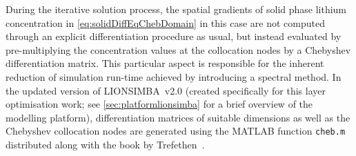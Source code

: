     During  the  iterative solution  process,  the  spatial gradients  of  solid
    phase  lithium  concentration  in  \cref{eq:solidDiffEqChebDomain}  in  this
    case  are  not  computed   through  an  explicit  differentiation  procedure
    as  usual,  but  instead  evaluated  by  pre-multiplying  the  concentration
    values  at the  collocation  nodes by  a  Chebyshev differentiation  matrix.
    This  particular  aspect  is  responsible  for  the  inherent  reduction  of
    simulation  run-time  achieved  by  introducing a  spectral  method.  In  the
    updated  version  of LIONSIMBA~v2.0  (created  specifically  for this  layer
    optimisation work; see \cref{sec:platformlionsimba}  for a brief overview of
    the  modelling platform),  differentiation matrices  of suitable  dimensions
    as  well  as  the  Chebyshev  collocation  nodes  are  generated  using  the
    MATLAB  function   \texttt{cheb.m}  distributed  along  with   the  book  by
    Trefethen~\cite{Trefethen2000}.




